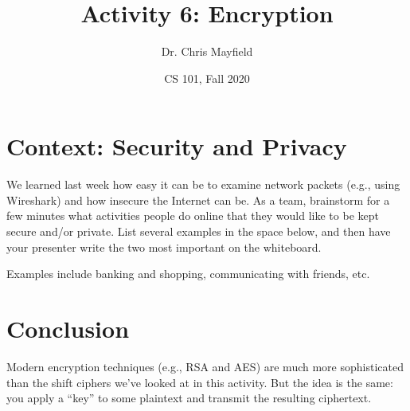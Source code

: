 \documentclass[12pt]{article}
\title{Activity 6: Encryption}
\author{Dr. Chris Mayfield}
\date{CS 101, Fall 2020}
\begin{document}
\maketitle

\section*{Context: Security and Privacy}

We learned last week how easy it can be to examine network packets (e.g., using Wireshark) and how insecure the Internet can be.
As a team, brainstorm for a few minutes what activities people do online that they would like to be kept secure and/or private.
List several examples in the space below, and then have your presenter write the two most important on the whiteboard.

\vspace{1ex}
\begin{answer}[12em]
Examples include banking and shopping, communicating with friends, etc.
\end{answer}





\newpage



\vfill

\section*{Conclusion}

Modern encryption techniques (e.g., RSA and AES) are much more sophisticated than the shift ciphers we've looked at in this activity.
But the idea is the same: you apply a ``key'' to some plaintext and transmit the resulting ciphertext.
\end{document}
